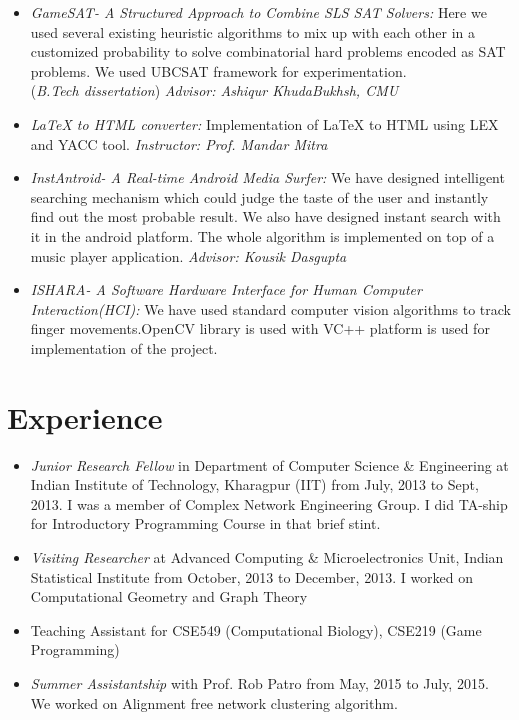 \documentclass{res}
\begin{document}
\begin{resume}
\begin{itemize}
 \item 
 {{\it GameSAT- A Structured Approach to Combine SLS SAT Solvers:}} Here we used several existing heuristic algorithms to mix up with each other in a customized probability to solve combinatorial hard problems encoded as SAT problems. We used UBCSAT framework for experimentation. \\
({\it B.Tech dissertation}) {\it Advisor: Ashiqur KhudaBukhsh, CMU}

\item{{\it \LaTeX\xspace to HTML converter:}} Implementation of \LaTeX\xspace to  HTML using LEX and YACC tool. {\it Instructor: Prof. Mandar Mitra}

\item {{\it InstAntroid- A Real-time Android Media Surfer:}} We have designed intelligent searching
  mechanism which could judge the taste of the user and instantly find out the most probable
  result. We also have designed instant search with it in the android platform. The whole
  algorithm is implemented on top of a music player application.
 {\it Advisor: Kousik Dasgupta}
 
 \item {{\it ISHARA- A Software Hardware Interface for Human Computer Interaction(HCI):}} We have used standard computer vision algorithms to track finger movements.OpenCV library is used with VC++ platform is used for implementation of the project.
 
 \end{itemize}
            
\section{Experience}
\begin{itemize}
\item {\it Junior Research Fellow} in Department of Computer Science \& Engineering at Indian Institute of Technology, Kharagpur (IIT) 
from July, 2013 to Sept, 2013. I was a member of Complex Network Engineering Group. I did TA-ship for Introductory Programming 
Course in that brief stint. 
\item {\it Visiting Researcher} at Advanced Computing \& Microelectronics Unit, Indian Statistical Institute from October, 2013 to December, 
2013. I worked on Computational Geometry and Graph Theory
\item  Teaching Assistant for CSE549 (Computational Biology), CSE219 (Game Programming)
\item {\it Summer Assistantship} with Prof. Rob Patro from May, 2015 to July, 2015. We worked on Alignment free network clustering algorithm. 
\end{itemize}


\end{resume}
\end{document}
